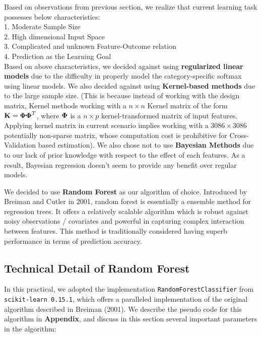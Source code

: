 \documentclass[11pt]{article}
\theoremstyle{definition}
\begin{document}
Based on observations from previous section, we realize that current learning task possesses below characteristics:\\

1. Moderate Sample Size\\
2. High dimensional Input Space\\
3. Complicated and unknown Feature-Outcome relation\\
4. Prediction as the Learning Goal\\

Based on above characteristics, we decided against using \textbf{regularized linear models} due to the difficulty in properly model the category-specific softmax using linear models. We also decided against using \textbf{Kernel-based methods} due to the large sample size. (This is because instead of working with the design matrix, Kernel methods working with a $n \times n$ Kernel matrix of the form ${\bf K} = \boldsymbol{\Phi} \boldsymbol{\Phi}^T$, where $\boldsymbol{\Phi}$ is a $n \times p$ kernel-transformed matrix of input features. Applying kernel matrix in current scenario implies working with a $3086 \times 3086$ potentially non-sparse matrix, whose computation cost is prohibitive for Cross-Validation based estimation). We also chose not to use \textbf{Bayesian Methods} due to our lack of prior knowledge with respect to the effect of each features. As a result, Bayesian regression doesn't seem to provide any benefit over regular models.

We decided to use \textbf{Random Forest} as our algorithm of choice. Introduced by Breiman and Cutler in 2001, random forest is essentially a ensemble method for regression trees. It offers a relatively  scalable algorithm which is robust against noisy observations / covariates and powerful in capturing complex interaction between features. This method is traditionally considered having superb performance in terms of prediction accuracy.


\subsection{\textbf{Technical Detail of Random Forest}}
In this practical, we adopted the implementation {\tt RandomForestClassifier} from {\tt scikit-learn 0.15.1}, which offers a paralleled implementation of the original algorithm described in Breiman (2001). We describe the pseudo code for this algorithm in \textbf{Appendix}, and discuss in this section several important parameters in the algorithm:\\
\end{document}

